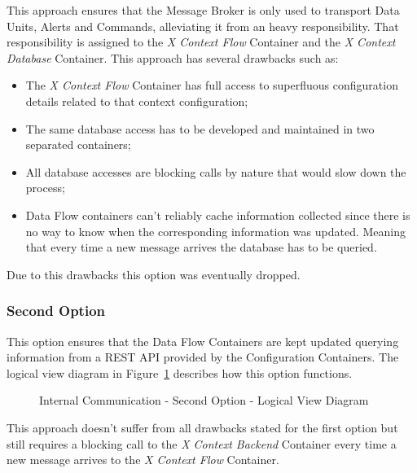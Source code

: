 This approach ensures that the Message Broker is only used to transport Data Units, Alerts and Commands, alleviating it from an heavy responsibility.
That responsibility is assigned to the \textit{X Context Flow} Container and the \textit{X Context Database} Container.
This approach has several drawbacks such as:

\begin{itemize}
   \item The \textit{X Context Flow} Container has full access to superfluous configuration details related to that context configuration;
   \item The same database access has to be developed and maintained in two separated containers;
   \item All database accesses are blocking calls by nature that would slow down the process;
   \item Data Flow containers can't reliably cache information collected since there is no way to know when the corresponding information was updated. Meaning that every time a new message arrives the database has to be queried.
\end{itemize}

Due to this drawbacks this option was eventually dropped.

\subsubsection{Second Option}
\label{subsubsec:design:alternatives:internal:second}

This option ensures that the Data Flow Containers are kept updated querying information from a \gls{REST} \gls{API} provided by the Configuration Containers. The logical view diagram in Figure~\ref{fig:design:alternatives:internal:second:diagram} describes how this option functions.

\begin{figure}[H]
   \centering
   \resizebox{\columnwidth}{!}
   {
      
   }
   \caption[Internal Communication - Second Option - Logical View Diagram]{Internal Communication - Second Option - Logical View Diagram}
   \label{fig:design:alternatives:internal:second:diagram}
\end{figure}

This approach doesn't suffer from all drawbacks stated for the first option but still requires a blocking call to the \textit{X Context Backend} Container every time a new message arrives to the \textit{X Context Flow} Container.

